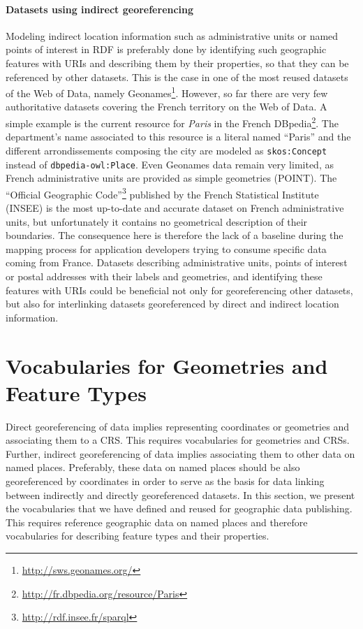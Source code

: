 \paragraph{Datasets using indirect georeferencing}
Modeling indirect location information such as administrative units or named points of interest in RDF is preferably done by identifying such geographic features with URIs and describing them by their properties, so that they can be referenced by other datasets. This is the case in one of the most reused datasets of the Web of Data, namely Geonames\footnote{\url{http://sws.geonames.org/}}. However, so far there are very few authoritative datasets covering the French territory on the Web of Data.  A simple example is the current resource for \textit{Paris} in the French DBpedia\footnote{\url{http://fr.dbpedia.org/resource/Paris}}. The department's name associated to this resource is a literal named ``Paris'' and the different arrondissements composing the city are modeled as \texttt{skos:Concept} instead of \texttt{dbpedia-owl:Place}. Even Geonames data remain very limited, as French administrative units are provided as simple geometries (POINT). The ``Official Geographic Code''\footnote{\url{http://rdf.insee.fr/sparql}} published by the French Statistical Institute (INSEE) is the most up-to-date and accurate dataset on French administrative units, but unfortunately it contains no geometrical description of their boundaries. The consequence here is therefore the lack of a baseline during the mapping process for application developers trying to consume specific data coming from France. Datasets describing administrative units, points of interest or postal addresses with their labels and geometries, and identifying these features with URIs could be beneficial not only for georeferencing other datasets, but also for interlinking datasets georeferenced by direct and indirect location information.

\section{Vocabularies for Geometries and Feature Types} 
\label{sec:geomfeaturevocab}

Direct georeferencing of data implies representing coordinates or geometries and associating them to a CRS.  This requires vocabularies for geometries and CRSs. Further, indirect georeferencing of data implies associating them to other data on named places. Preferably, these data on named places should be also georeferenced by coordinates in order to serve as the basis for data linking between indirectly and directly georeferenced datasets. In this section, we present the vocabularies that we have defined and reused for geographic data publishing.
This requires reference geographic data on named places and therefore vocabularies for describing feature types and their properties. 

